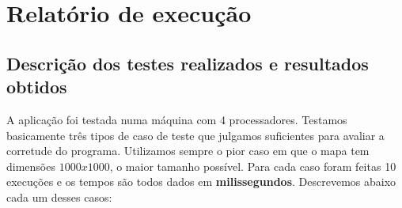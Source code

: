 \documentclass[a4paper,landscape,12pt]{article}
\begin{document}
\section{Relatório de execução}

\subsection{Descrição dos testes realizados e resultados obtidos}
A aplicação foi testada numa máquina com 4 processadores. Testamos basicamente três tipos de caso de teste que julgamos suficientes pa\-ra avaliar a corretude do programa. Utilizamos sempre o pior caso em que o mapa tem dimensões $ 1000x1000 $, o maior tamanho possível. Para cada caso foram feitas 10 execuções e os tempos são todos dados em \textbf{milissegundos}. Descrevemos abaixo cada um desses casos:
\end{document}
